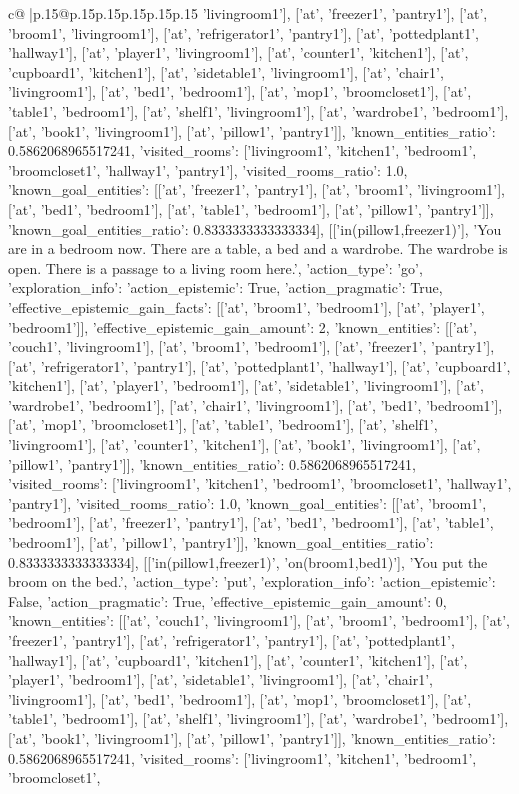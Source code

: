 \documentclass{article}
\begin{document}
{\begin{supertabular}{c@{$\;$}|p{.15\linewidth}@{}p{.15\linewidth}p{.15\linewidth}p{.15\linewidth}p{.15\linewidth}p{.15\linewidth}}
{{{'livingroom1'], ['at', 'freezer1', 'pantry1'], ['at', 'broom1', 'livingroom1'], ['at', 'refrigerator1', 'pantry1'], ['at', 'pottedplant1', 'hallway1'], ['at', 'player1', 'livingroom1'], ['at', 'counter1', 'kitchen1'], ['at', 'cupboard1', 'kitchen1'], ['at', 'sidetable1', 'livingroom1'], ['at', 'chair1', 'livingroom1'], ['at', 'bed1', 'bedroom1'], ['at', 'mop1', 'broomcloset1'], ['at', 'table1', 'bedroom1'], ['at', 'shelf1', 'livingroom1'], ['at', 'wardrobe1', 'bedroom1'], ['at', 'book1', 'livingroom1'], ['at', 'pillow1', 'pantry1']], 'known_entities_ratio': 0.5862068965517241, 'visited_rooms': ['livingroom1', 'kitchen1', 'bedroom1', 'broomcloset1', 'hallway1', 'pantry1'], 'visited_rooms_ratio': 1.0, 'known_goal_entities': [['at', 'freezer1', 'pantry1'], ['at', 'broom1', 'livingroom1'], ['at', 'bed1', 'bedroom1'], ['at', 'table1', 'bedroom1'], ['at', 'pillow1', 'pantry1']], 'known_goal_entities_ratio': 0.8333333333333334}}], [['in(pillow1,freezer1)'], 'You are in a bedroom now. There are a table, a bed and a wardrobe. The wardrobe is open. There is a passage to a living room here.', {'action_type': 'go', 'exploration_info': {'action_epistemic': True, 'action_pragmatic': True, 'effective_epistemic_gain_facts': [['at', 'broom1', 'bedroom1'], ['at', 'player1', 'bedroom1']], 'effective_epistemic_gain_amount': 2, 'known_entities': [['at', 'couch1', 'livingroom1'], ['at', 'broom1', 'bedroom1'], ['at', 'freezer1', 'pantry1'], ['at', 'refrigerator1', 'pantry1'], ['at', 'pottedplant1', 'hallway1'], ['at', 'cupboard1', 'kitchen1'], ['at', 'player1', 'bedroom1'], ['at', 'sidetable1', 'livingroom1'], ['at', 'wardrobe1', 'bedroom1'], ['at', 'chair1', 'livingroom1'], ['at', 'bed1', 'bedroom1'], ['at', 'mop1', 'broomcloset1'], ['at', 'table1', 'bedroom1'], ['at', 'shelf1', 'livingroom1'], ['at', 'counter1', 'kitchen1'], ['at', 'book1', 'livingroom1'], ['at', 'pillow1', 'pantry1']], 'known_entities_ratio': 0.5862068965517241, 'visited_rooms': ['livingroom1', 'kitchen1', 'bedroom1', 'broomcloset1', 'hallway1', 'pantry1'], 'visited_rooms_ratio': 1.0, 'known_goal_entities': [['at', 'broom1', 'bedroom1'], ['at', 'freezer1', 'pantry1'], ['at', 'bed1', 'bedroom1'], ['at', 'table1', 'bedroom1'], ['at', 'pillow1', 'pantry1']], 'known_goal_entities_ratio': 0.8333333333333334}}], [['in(pillow1,freezer1)', 'on(broom1,bed1)'], 'You put the broom on the bed.', {'action_type': 'put', 'exploration_info': {'action_epistemic': False, 'action_pragmatic': True, 'effective_epistemic_gain_amount': 0, 'known_entities': [['at', 'couch1', 'livingroom1'], ['at', 'broom1', 'bedroom1'], ['at', 'freezer1', 'pantry1'], ['at', 'refrigerator1', 'pantry1'], ['at', 'pottedplant1', 'hallway1'], ['at', 'cupboard1', 'kitchen1'], ['at', 'counter1', 'kitchen1'], ['at', 'player1', 'bedroom1'], ['at', 'sidetable1', 'livingroom1'], ['at', 'chair1', 'livingroom1'], ['at', 'bed1', 'bedroom1'], ['at', 'mop1', 'broomcloset1'], ['at', 'table1', 'bedroom1'], ['at', 'shelf1', 'livingroom1'], ['at', 'wardrobe1', 'bedroom1'], ['at', 'book1', 'livingroom1'], ['at', 'pillow1', 'pantry1']], 'known_entities_ratio': 0.5862068965517241, 'visited_rooms': ['livingroom1', 'kitchen1', 'bedroom1', 'broomcloset1', }}}
\end{supertabular}}
\end{document}
